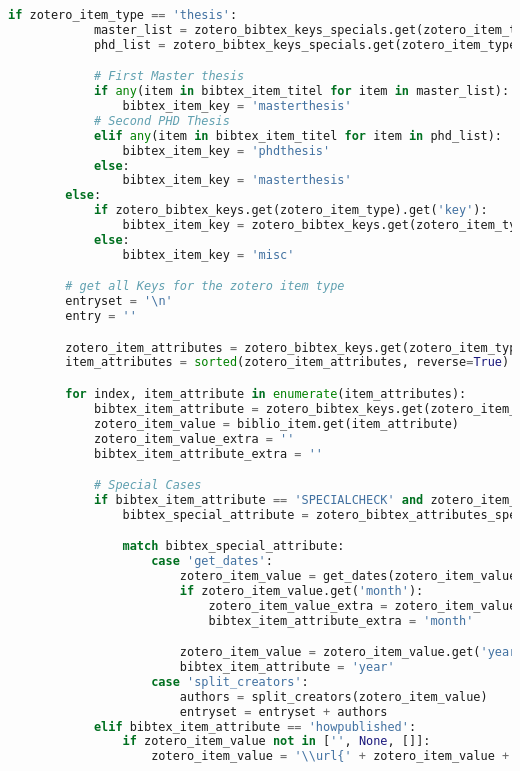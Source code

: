 \begin{lstlisting}[language=python, caption=Python LaTex - zotero.py - Zotero BibLaTex Importer,captionpos=b,label={lst:zotero},breaklines=true]
        if zotero_item_type == 'thesis':
            master_list = zotero_bibtex_keys_specials.get(zotero_item_type).get('masterthesis')
            phd_list = zotero_bibtex_keys_specials.get(zotero_item_type).get('phdthesis')

            # First Master thesis
            if any(item in bibtex_item_titel for item in master_list):
                bibtex_item_key = 'masterthesis'
            # Second PHD Thesis
            elif any(item in bibtex_item_titel for item in phd_list):
                bibtex_item_key = 'phdthesis'
            else:
                bibtex_item_key = 'masterthesis'
        else:
            if zotero_bibtex_keys.get(zotero_item_type).get('key'):
                bibtex_item_key = zotero_bibtex_keys.get(zotero_item_type).get('key')
            else:
                bibtex_item_key = 'misc'

        # get all Keys for the zotero item type
        entryset = '\n'
        entry = ''

        zotero_item_attributes = zotero_bibtex_keys.get(zotero_item_type).get('attributes').keys()
        item_attributes = sorted(zotero_item_attributes, reverse=True)

        for index, item_attribute in enumerate(item_attributes):
            bibtex_item_attribute = zotero_bibtex_keys.get(zotero_item_type).get('attributes').get(item_attribute)
            zotero_item_value = biblio_item.get(item_attribute)
            zotero_item_value_extra = ''
            bibtex_item_attribute_extra = ''

            # Special Cases
            if bibtex_item_attribute == 'SPECIALCHECK' and zotero_item_value not in ['', None]:
                bibtex_special_attribute = zotero_bibtex_attributes_special.get(item_attribute)

                match bibtex_special_attribute:
                    case 'get_dates':
                        zotero_item_value = get_dates(zotero_item_value, bibtex_item_key, bibtex_month_attributes)
                        if zotero_item_value.get('month'):
                            zotero_item_value_extra = zotero_item_value.get('month')
                            bibtex_item_attribute_extra = 'month'

                        zotero_item_value = zotero_item_value.get('year')
                        bibtex_item_attribute = 'year'
                    case 'split_creators':
                        authors = split_creators(zotero_item_value)
                        entryset = entryset + authors
            elif bibtex_item_attribute == 'howpublished':
                if zotero_item_value not in ['', None, []]:
                    zotero_item_value = '\\url{' + zotero_item_value + '}'


\end{lstlisting}
